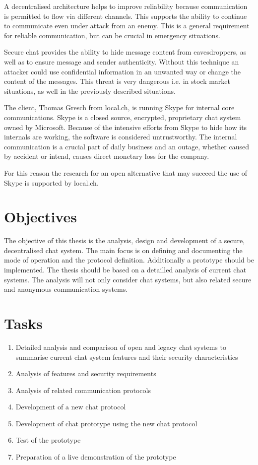 A decentralised architecture helps to improve reliability because communication is
permitted to flow via different channels. This supports the ability to 
continue to communicate even under attack from an enemy. This is a general
requirement for reliable communication, but can be crucial in emergency situations.

Secure chat provides the ability to hide message content from eavesdroppers,
as well as to ensure message and sender authenticity.  Without this technique
an attacker could use confidential information in an unwanted way or change the
content of the messages. This threat is very dangerous i.e. in stock market 
situations, as well in the previously described situations.

The client, Thomas Gresch from local.ch, is running Skype for internal core 
communications. Skype is a closed source, encrypted, proprietary chat system 
owned by Microsoft. Because of the intensive efforts from Skype to hide how 
its internals are working, the software is considered untrustworthy.
The internal communication is a crucial part of daily business and an 
outage, whether caused by accident or intend, causes direct monetary 
loss for the company.

For this reason the research for an open alternative that may succeed 
the use of Skype is supported by local.ch.
\section{Objectives}
\label{objectives}
The objective of this thesis is the analysis, design and development of a secure, decentralised chat system. The main focus is on defining and documenting the mode of operation and the protocol definition. Additionally a prototype should be implemented. The thesis should be based on a detailled analysis of current chat systems. The analysis will not only consider chat systems, but also related secure and anonymous communication systems.
\section{Tasks}
\begin{enumerate}
\item Detailed analysis and comparison of open and legacy chat systems to summarise current chat system features and their security characteristics
\item Analysis of features and security requirements
\item Analysis of related communication protocols
\item Development of a new chat protocol
\item Development of chat prototype using the new chat protocol
\item Test of the prototype
\item Preparation of a live demonstration of the prototype
\end{enumerate}
